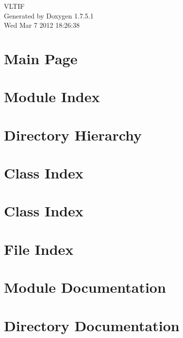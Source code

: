 \documentclass[a4paper]{book}
\begin{document}
\hypersetup{pageanchor=false,citecolor=blue}
\begin{titlepage}
\vspace*{7cm}
\begin{center}
{\Large \-V\-L\-T\-I\-F }\\
\vspace*{1cm}
{\large \-Generated by Doxygen 1.7.5.1}\\
\vspace*{0.5cm}
{\small Wed Mar 7 2012 18:26:38}\\
\end{center}
\end{titlepage}
\clearemptydoublepage
{}
\tableofcontents
\clearemptydoublepage
{}
\hypersetup{pageanchor=true,citecolor=blue}
\chapter{\-Main \-Page}
\label{index}\hypertarget{index}{}
\chapter{\-Module \-Index}

\chapter{\-Directory \-Hierarchy}

\chapter{\-Class \-Index}

\chapter{\-Class \-Index}

\chapter{\-File \-Index}

\chapter{\-Module \-Documentation}




\chapter{\-Directory \-Documentation}





\end{document}
